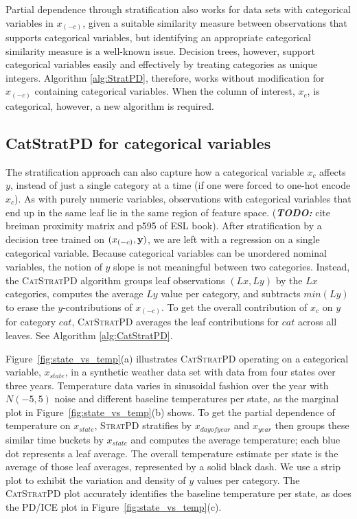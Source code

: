\documentclass[12pt]{article}
\newcommand{\figref}[1]{Figure~\ref{#1}}
\newcommand{\todo}[1]{{\bf\em TODO:} {{#1}}}
\newcommand{\spd}{\fontfamily{cmr}\textsc{\small StratPD}}
\newcommand{\cspd}{\fontfamily{cmr}\textsc{\small CatStratPD}}
\newcommand{\xnc}{$x_{(-c)}$}
\begin{document}
Partial dependence through stratification also works for data sets with categorical variables in \xnc{}, given a suitable similarity measure between observations that supports categorical variables, but identifying an appropriate categorical similarity measure is a well-known issue.  Decision trees, however, support categorical variables easily and effectively by treating categories as unique integers. Algorithm \ref{alg:StratPD}, therefore, works without modification for \xnc{} containing categorical variables. When the column of interest, $x_c$, is categorical, however, a new algorithm is required.

\subsection{CatStratPD for categorical variables}

The stratification approach can also capture how a categorical variable $x_c$ affects $y$, instead of just a single category at a time (if one were forced to one-hot encode $x_c$). As with purely numeric variables, observations with categorical variables that end up in the same leaf lie in the same region of feature space. (\todo cite breiman proximity matrix and p595 of ESL book). After stratification by a decision tree trained on $(x_{(-c)}, {\bf y})$, we are left with a regression on a single categorical variable. Because categorical variables can be unordered nominal variables, the notion of $y$ slope is not meaningful between two categories. Instead, the \cspd{} algorithm groups leaf observations $(Lx, Ly)$ by the $Lx$ categories, computes the average $Ly$ value per category, and subtracts $min(Ly)$ to erase the $y$-contributions of \xnc{}.  To get the overall contribution of $x_c$ on $y$ for category $cat$,  \cspd{} averages the leaf contributions for $cat$ across all leaves. See Algorithm \ref{alg:CatStratPD}.

\figref{fig:state_vs_temp}(a) illustrates \cspd{} operating on a categorical variable, $x_{state}$, in a synthetic weather data set with data from four states over three years. Temperature data varies in sinusoidal fashion over the year with $N(-5,5)$ noise and different baseline temperatures per state, as the marginal plot in \figref{fig:state_vs_temp}(b) shows. To get the partial dependence of temperature on $x_{state}$, \spd{} stratifies by $x_{dayofyear}$ and $x_{year}$ then groups these similar time buckets by $x_{state}$ and computes the average temperature; each blue dot represents a leaf average. The overall temperature estimate per state is the average of those leaf averages, represented by a solid black dash. We use a strip plot to exhibit the variation and density of $y$ values per category. The \cspd{} plot accurately identifies the baseline temperature per state, as does the PD/ICE plot in \figref{fig:state_vs_temp}(c).
\end{document}
